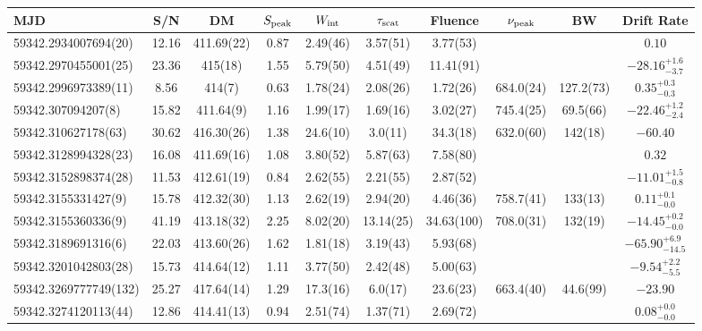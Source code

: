
\scriptsize
\setlength{\tabcolsep}{0.5pt}


{\tiny
\renewcommand{\arraystretch}{1}
{\fontsize{2}{3}\selectfont
\begin{longtable}{lccccccccc}

\hline

MJD & S/N & DM & $S_{\rm peak}$ & $W_{\rm int}$ & {$\tau_{\rm scat}$}  & Fluence & $\nu_{\rm peak}$ & BW & Drift Rate
\\
\hline
59342.2934007694(20) & 12.16 & 411.69(22) & 0.87 & 2.49(46) & 3.57(51)  & 3.77(53) &  &  & $0.10$ \\
\hline
59342.2970455001(25) & 23.36 & 415(18) & 1.55 & 5.79(50) & 4.51(49)  & 11.41(91) &  &  & $-28.16^{+1.6}_{-3.7}$ \\
\hline
59342.2996973389(11) & 8.56 & 414(7) & 0.63 & 1.78(24) & 2.08(26)  & 1.72(26) & 684.0(24) & 127.2(73) & $0.35^{+0.3}_{-0.3}$ \\
\hline
59342.307094207(8) & 15.82 & 411.64(9) & 1.16 & 1.99(17) & 1.69(16)  & 3.02(27) & 745.4(25) & 69.5(66) & $-22.46^{+1.2}_{-2.4}$ \\
\hline
59342.310627178(63) & 30.62 & 416.30(26) & 1.38 & 24.6(10) & 3.0(11)  & 34.3(18) & 632.0(60) & 142(18) & $-60.40$ \\
\hline
59342.3128994328(23) & 16.08 & 411.69(16) & 1.08 & 3.80(52) & 5.87(63)  & 7.58(80) &  &  & $0.32$ \\
\hline
59342.3152898374(28) & 11.53 & 412.61(19) & 0.84 & 2.62(55) & 2.21(55)  & 2.87(52) &  &  & $-11.01^{+1.5}_{-0.8}$ \\
\hline
59342.3155331427(9) & 15.78 & 412.32(30) & 1.13 & 2.62(19) & 2.94(20)  & 4.46(36) & 758.7(41) & 133(13) & $0.11^{+0.1}_{-0.0}$ \\
\hline
59342.3155360336(9) & 41.19 & 413.18(32) & 2.25 & 8.02(20) & 13.14(25)  & 34.63(100) & 708.0(31) & 132(19) & $-14.45^{+0.2}_{-0.0}$ \\
\hline
59342.3189691316(6) & 22.03 & 413.60(26) & 1.62 & 1.81(18) & 3.19(43)  & 5.93(68) &  &  & $-65.90^{+6.9}_{-14.5}$ \\
\hline
59342.3201042803(28) & 15.73 & 414.64(12) & 1.11 & 3.77(50) & 2.42(48)  & 5.00(63) &  &  & $-9.54^{+2.2}_{-5.5}$ \\
\hline
59342.3269777749(132) & 25.27 & 417.64(14) & 1.29 & 17.3(16) & 6.0(17)  & 23.6(23) & 663.4(40) & 44.6(99) & $-23.90$ \\
\hline
59342.3274120113(44) & 12.86 & 414.41(13) & 0.94 & 2.51(74) & 1.37(71)  & 2.69(72) &  &  & $0.08^{+0.0}_{-0.0}$ \\

\end{longtable}}}
